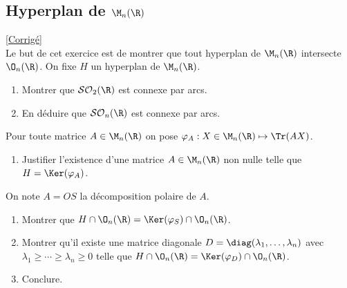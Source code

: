 \documentclass[8pt]{book}
\begin{document}
\subsection{Hyperplan de $\M_n(\R)$}
\label{Hyperplan de Mn(R)}
\textcolor{blue}{\hyperref[Hyperplan de Mn(R) corrigé]{[Corrigé]}}\\
Le but de cet exercice est de montrer que tout hyperplan de $\M_n(\R)$ intersecte $\O_n(\R)$. On fixe $H$ un hyperplan de $\M_n(\R)$.
\begin{enumerate}
	\item Montrer que $\mathcal{SO}_2(\R)$ est connexe par arcs.
	\item En déduire que $\mathcal{SO}_n(\R)$ est connexe par arcs.
\end{enumerate}
Pour toute matrice $A\in \M_n(\R)$ on pose $\varphi_A:X\in \M_n(\R)\mapsto\Tr(AX)$.
\begin{enumerate}[resume]
	\item Justifier l'existence d'une matrice $A\in \M_n(\R)$ non nulle telle que $H=\Ker(\varphi_A)$.
\end{enumerate}
On note $A=OS$ la décomposition polaire de $A$.
\begin{enumerate}[resume]
	\item Montrer que $H\cap\O_n(\R)=\Ker(\varphi_S)\cap\O_n(\R)$.
	\item Montrer qu'il existe une matrice diagonale $D=\diag(\lambda_1,\dots,\lambda_n)$ avec $\lambda_1\geq \cdots\geq \lambda_n\geq 0$ telle que $H\cap\O_n(\R)=\Ker(\varphi_D)\cap\O_n(\R)$.
	\item Conclure.
\end{enumerate}
\end{document}
